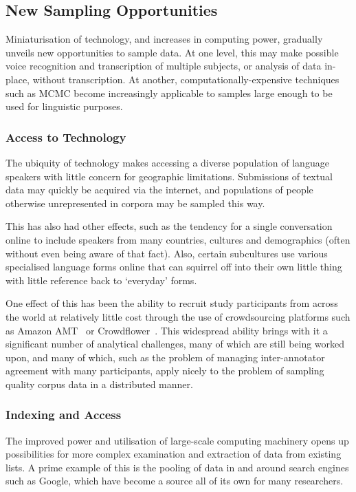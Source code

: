 \subsection{New Sampling Opportunities}
Miniaturisation of technology, and increases in computing power, gradually unveils new opportunities to sample data.  At one level, this may make possible voice recognition and transcription of multiple subjects, or analysis of data in-place, without transcription.  At another, computationally-expensive techniques such as MCMC become increasingly applicable to samples large enough to be used for linguistic purposes.


\subsubsection{Access to Technology}
The ubiquity of technology makes accessing a diverse population of language speakers with little concern for geographic limitations.  Submissions of textual data may quickly be acquired via the internet, and populations of people otherwise unrepresented in corpora may be sampled this way.


This has also had other effects, such as the tendency for a single conversation online to include speakers from many countries, cultures and demographics (often without even being aware of that fact).  Also, certain subcultures use various specialised language forms online that can squirrel off into their own little thing with little reference back to `everyday' forms.

One effect of this has been the ability to recruit study participants from across the world at relatively little cost through the use of crowdsourcing platforms such as Amazon AMT~\cite{ipeirotis2010analyzing} or Crowdflower~\cite{Finin:2010:ANE:1866696.1866709}.  This widespread ability brings with it a significant number of analytical challenges, many of which are still being worked upon, and many of which, such as the problem of managing inter-annotator agreement with many participants, apply nicely to the problem of sampling quality corpus data in a distributed manner.

  


\subsubsection{Indexing and Access}
The improved power and utilisation of large-scale computing machinery opens up possibilities for more complex examination and extraction of data from existing lists.  A prime example of this is the pooling of data in and around search engines such as Google, which have become a source all of its own for many researchers.

